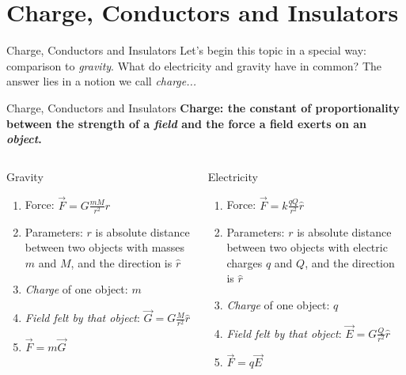 \documentclass{beamer}
\begin{document}
\section{Charge, Conductors and Insulators}

\begin{frame}{Charge, Conductors and Insulators}
Let's begin this topic in a special way: comparison to \textit{gravity}.  What do electricity and gravity have in common?  The answer lies in a notion we call \textit{charge...}
\end{frame}

\begin{frame}{Charge, Conductors and Insulators}
\centering
\textbf{\alert{Charge: the constant of proportionality between the strength of a \textit{field} and the force a field exerts on an \textit{object}.}} \\
\hrulefill
\small
\begin{columns}[T]
\begin{column}{0.5\textwidth}
\alert{Gravity}
\begin{enumerate}
\item Force: $\vec{F} = G \frac{m M}{r^2} \hat{r}$
\item Parameters: $r$ is absolute distance between two objects with masses $m$ and $M$, and the direction is $\hat{r}$
\item \textit{Charge} of one object: $m$
\item \textit{Field felt by that object}: $\vec{G} = G \frac{M}{r^2} \hat{r}$
\item $\vec{F} = m \vec{G}$
\end{enumerate}
\end{column}
\begin{column}{0.5\textwidth}
\alert{Electricity}
\begin{enumerate}
\item Force: $\vec{F} = k \frac{q Q}{r^2} \hat{r}$
\item Parameters: $r$ is absolute distance between two objects with electric charges $q$ and $Q$, and the direction is $\hat{r}$
\item \textit{Charge} of one object: $q$
\item \textit{Field felt by that object}: $\vec{E} = G \frac{Q}{r^2} \hat{r}$
\item $\vec{F} = q \vec{E}$
\end{enumerate}
\end{column}
\end{columns}
\end{frame}
\end{document}

